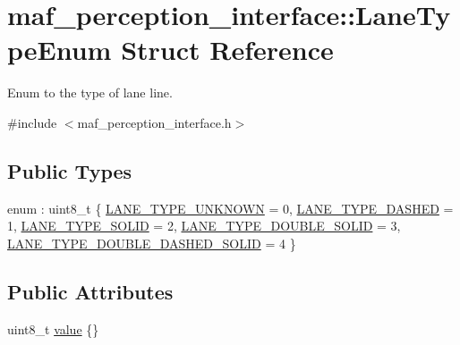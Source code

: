 \hypertarget{structmaf__perception__interface_1_1LaneTypeEnum}{}\section{maf\+\_\+perception\+\_\+interface\+:\+:Lane\+Type\+Enum Struct Reference}
\label{structmaf__perception__interface_1_1LaneTypeEnum}


Enum to the type of lane line.  




{\ttfamily \#include $<$maf\+\_\+perception\+\_\+interface.\+h$>$}

\subsection*{Public Types}
\begin{DoxyCompactItemize}
\item 
enum \+: uint8\+\_\+t \{ \newline
\hyperlink{structmaf__perception__interface_1_1LaneTypeEnum_acb7954b3a5a2b7849830be8f2d421906a1ba317cb269d17ba95101ab5f28dff79}{L\+A\+N\+E\+\_\+\+T\+Y\+P\+E\+\_\+\+U\+N\+K\+N\+O\+WN} = 0, 
\hyperlink{structmaf__perception__interface_1_1LaneTypeEnum_acb7954b3a5a2b7849830be8f2d421906ac8a3fdee86a8e4be3736986c9527a077}{L\+A\+N\+E\+\_\+\+T\+Y\+P\+E\+\_\+\+D\+A\+S\+H\+ED} = 1, 
\hyperlink{structmaf__perception__interface_1_1LaneTypeEnum_acb7954b3a5a2b7849830be8f2d421906a596c90acd877f91f8856b3a82ba74e4f}{L\+A\+N\+E\+\_\+\+T\+Y\+P\+E\+\_\+\+S\+O\+L\+ID} = 2, 
\hyperlink{structmaf__perception__interface_1_1LaneTypeEnum_acb7954b3a5a2b7849830be8f2d421906a1d5f4b6082ffde3c0be2422c12ee2764}{L\+A\+N\+E\+\_\+\+T\+Y\+P\+E\+\_\+\+D\+O\+U\+B\+L\+E\+\_\+\+S\+O\+L\+ID} = 3, 
\newline
\hyperlink{structmaf__perception__interface_1_1LaneTypeEnum_acb7954b3a5a2b7849830be8f2d421906a418a22c2b1c4b87af582ef4caf60cf9f}{L\+A\+N\+E\+\_\+\+T\+Y\+P\+E\+\_\+\+D\+O\+U\+B\+L\+E\+\_\+\+D\+A\+S\+H\+E\+D\+\_\+\+S\+O\+L\+ID} = 4
 \}
\end{DoxyCompactItemize}
\subsection*{Public Attributes}
\begin{DoxyCompactItemize}
\item 
uint8\+\_\+t \hyperlink{structmaf__perception__interface_1_1LaneTypeEnum_a0420e822d0133aeaa606c2e494c942c9}{value} \{\}
\end{DoxyCompactItemize}


